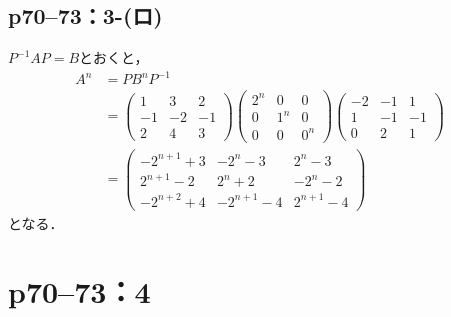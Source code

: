 \documentclass[a4paper,10pt,fleqn]{ltjsarticle}
\begin{document}
\subsection*{p70--73：3-(ロ)}


\begin{tleftbar}
  $P^{-1} A P = B$とおくと，
  \begin{align*}
    A^n & = P B^n P^{-1}                                                                                                                                                                                                      \\
        & = \begin{pmatrix} 1 & 3 & 2 \\ -1 & -2 & -1 \\ 2 & 4 & 3 \end{pmatrix} \begin{pmatrix} 2^n & 0 & 0 \\ 0 & 1^n & 0 \\ 0 & 0 & 0^n \end{pmatrix} \begin{pmatrix} -2 & -1 & 1\\ 1 & -1 & -1 \\ 0 & 2 & 1 \end{pmatrix} \\
        & = \begin{pmatrix} -2^{n+1}+3 & -2^n -3 & 2^n -3 \\ 2^{n+1}-2 & 2^n +2 & -2^n -2 \\ -2^{n+2}+4 & -2^{n+1} -4 & 2^{n+1} -4 \end{pmatrix}
  \end{align*}
  となる．
\end{tleftbar}
\newpage


\section*{p70--73：4}
\end{document}
